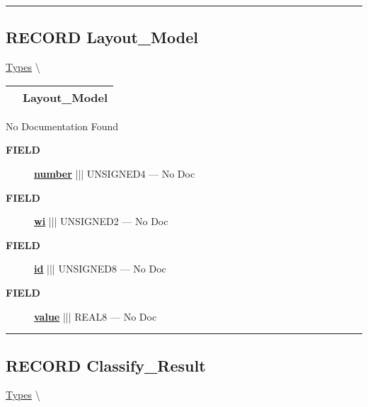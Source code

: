 \rule{\linewidth}{0.5pt}
\subsection*{\textsf{\colorbox{headtoc}{\color{white} RECORD}
Layout\_Model}}

\hypertarget{ecldoc:ml_core.types.layout_model}{}
\hspace{0pt} \hyperlink{ecldoc:ML_Core.Types}{Types} \textbackslash 

{\renewcommand{\arraystretch}{1.5}
\begin{tabularx}{\textwidth}{|>{\raggedright\arraybackslash}l|X|}
\hline
\hspace{0pt}\mytexttt{\color{red} } & \textbf{Layout\_Model} \\
\hline
\end{tabularx}
}

\par





No Documentation Found







\par
\begin{description}
\item [\colorbox{tagtype}{\color{white} \textbf{\textsf{FIELD}}}] \textbf{\underline{number}} ||| UNSIGNED4 --- No Doc
\item [\colorbox{tagtype}{\color{white} \textbf{\textsf{FIELD}}}] \textbf{\underline{wi}} ||| UNSIGNED2 --- No Doc
\item [\colorbox{tagtype}{\color{white} \textbf{\textsf{FIELD}}}] \textbf{\underline{id}} ||| UNSIGNED8 --- No Doc
\item [\colorbox{tagtype}{\color{white} \textbf{\textsf{FIELD}}}] \textbf{\underline{value}} ||| REAL8 --- No Doc
\end{description}





\rule{\linewidth}{0.5pt}
\subsection*{\textsf{\colorbox{headtoc}{\color{white} RECORD}
Classify\_Result}}

\hypertarget{ecldoc:ml_core.types.classify_result}{}
\hspace{0pt} \hyperlink{ecldoc:ML_Core.Types}{Types} \textbackslash 


